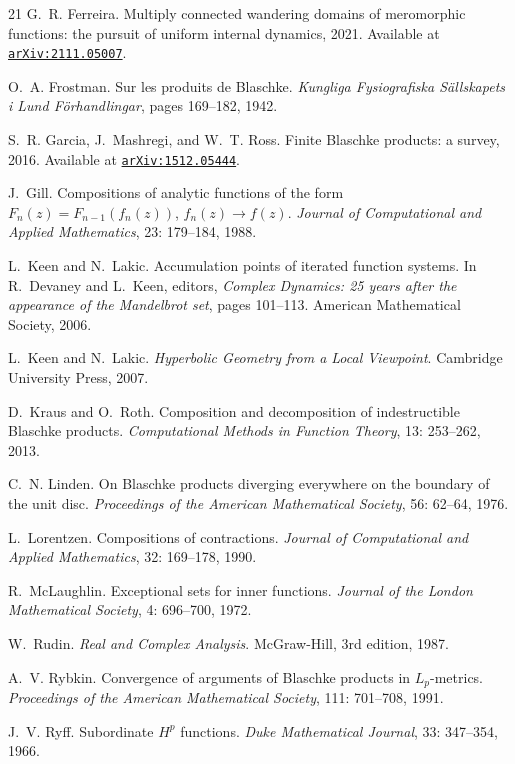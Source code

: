\documentclass[a4paper,11pt]{article}
\theoremstyle{plain}
\theoremstyle{definition}
\theoremstyle{definition}
\begin{document}
\begin{thebibliography}{21}
G.~R. Ferreira.
\newblock Multiply connected wandering domains of meromorphic functions: the
  pursuit of uniform internal dynamics, 2021.
\newblock Available at
  \href{https://arxiv.org/abs/2111.05007}{\texttt{arXiv:2111.05007}}.

O.~A. Frostman.
\newblock Sur les produits de {Blaschke}.
\newblock \emph{Kungliga Fysiografiska S{\"a}llskapets i Lund
  F{\"o}rhandlingar}, pages 169--182, 1942.

S.~R. Garcia, J.~Mashregi, and W.~T. Ross.
\newblock Finite {Blaschke} products: a survey, 2016.
\newblock Available at
  \href{https://arxiv.org/abs/1512.05444}{\texttt{arXiv:1512.05444}}.

J.~Gill.
\newblock Compositions of analytic functions of the form {$F_n(z) =
  F_{n-1}(f_n(z))$, $f_n(z)\to f(z)$}.
\newblock \emph{Journal of Computational and Applied Mathematics}, 23:
  179--184, 1988.

L.~Keen and N.~Lakic.
\newblock Accumulation points of iterated function systems.
\newblock In R.~Devaney and L.~Keen, editors, \emph{Complex Dynamics: 25 years
  after the appearance of the Mandelbrot set}, pages 101--113. American
  Mathematical Society, 2006.

L.~Keen and N.~Lakic.
\newblock \emph{Hyperbolic Geometry from a Local Viewpoint}.
\newblock Cambridge University Press, 2007.

D.~Kraus and O.~Roth.
\newblock Composition and decomposition of indestructible {B}laschke products.
\newblock \emph{Computational Methods in Function Theory}, 13:
  253--262, 2013.

C.~N. Linden.
\newblock On {B}laschke products diverging everywhere on the boundary of the
  unit disc.
\newblock \emph{Proceedings of the American Mathematical Society}, 56:
  62--64, 1976.

L.~Lorentzen.
\newblock Compositions of contractions.
\newblock \emph{Journal of Computational and Applied Mathematics}, 32:
  169--178, 1990.

R.~McLaughlin.
\newblock Exceptional sets for inner functions.
\newblock \emph{Journal of the London Mathematical Society}, 4:
  696--700, 1972.

W.~Rudin.
\newblock \emph{Real and Complex Analysis}.
\newblock McGraw-Hill, 3rd edition, 1987.

A.~V. Rybkin.
\newblock Convergence of arguments of {Blaschke} products in {$L_p$}-metrics.
\newblock \emph{Proceedings of the American Mathematical Society},
  111: 701--708, 1991.

J.~V. Ryff.
\newblock Subordinate {$H^p$} functions.
\newblock \emph{Duke Mathematical Journal}, 33: 347--354, 1966.

\end{thebibliography}
\end{document}

